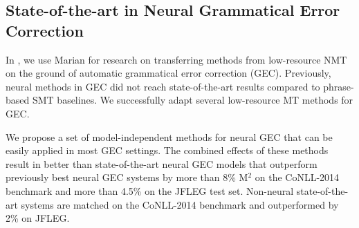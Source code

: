 \documentclass[11pt,a4paper]{article}
\begin{document}
\subsection{State-of-the-art in Neural Grammatical Error Correction}

In , we use Marian for research on transferring methods from low-resource NMT on the ground of automatic grammatical error correction (GEC).
Previously, neural methods in GEC did not reach state-of-the-art results compared to phrase-based SMT baselines. We successfully adapt several low-resource MT methods for GEC.
  
We propose a set of model-independent methods for neural GEC that can be easily applied in most GEC settings.
The combined effects of these methods result in better than state-of-the-art neural GEC models that outperform previously best neural GEC systems by more than 8\% M$^2$ on the CoNLL-2014 benchmark and more than 4.5\% on the JFLEG test set. Non-neural state-of-the-art systems are matched on the CoNLL-2014 benchmark and outperformed by 2\% on JFLEG.
\end{document}
